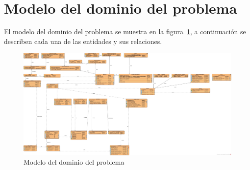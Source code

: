 \section{Modelo del dominio del problema}
\label{sec:hechosDeNegocio}


	El modelo del dominio del problema se muestra en la figura~\ref{fig:modeloDeDominio}, a continuación se describen cada una de las entidades y sus relaciones.
	
\begin{figure}[htpb!]
	\begin{center}
		\includegraphics[angle=90,width=.60\textwidth]{images/Base_Datos}
		\caption{Modelo del dominio del problema}
		\label{fig:modeloDeDominio}
	\end{center}
\end{figure}

